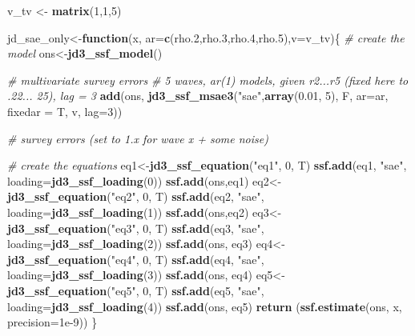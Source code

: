 \documentclass[]{article}
\newenvironment{Shaded}{\begin{snugshade}}{\end{snugshade}}
\newcommand{\KeywordTok}[1]{\textcolor[rgb]{0.13,0.29,0.53}{\textbf{#1}}}
\newcommand{\DataTypeTok}[1]{\textcolor[rgb]{0.13,0.29,0.53}{#1}}
\newcommand{\DecValTok}[1]{\textcolor[rgb]{0.00,0.00,0.81}{#1}}
\newcommand{\FloatTok}[1]{\textcolor[rgb]{0.00,0.00,0.81}{#1}}
\newcommand{\StringTok}[1]{\textcolor[rgb]{0.31,0.60,0.02}{#1}}
\newcommand{\CommentTok}[1]{\textcolor[rgb]{0.56,0.35,0.01}{\textit{#1}}}
\newcommand{\ControlFlowTok}[1]{\textcolor[rgb]{0.13,0.29,0.53}{\textbf{#1}}}
\newcommand{\NormalTok}[1]{#1}
\begin{document}
\begin{Shaded}
\begin{Highlighting}[]
\NormalTok{v_tv <-}\StringTok{ }\KeywordTok{matrix}\NormalTok{(}\DecValTok{1}\NormalTok{,}\DecValTok{1}\NormalTok{,}\DecValTok{5}\NormalTok{)}

\NormalTok{jd_sae_only<-}\ControlFlowTok{function}\NormalTok{(x, }\DataTypeTok{ar=}\KeywordTok{c}\NormalTok{(rho.}\DecValTok{2}\NormalTok{,rho.}\DecValTok{3}\NormalTok{,rho.}\DecValTok{4}\NormalTok{,rho.}\DecValTok{5}\NormalTok{),}\DataTypeTok{v=}\NormalTok{v_tv)\{}
  \CommentTok{# create the model}
\NormalTok{  ons<-}\KeywordTok{jd3_ssf_model}\NormalTok{()}
  
  \CommentTok{# multivariate survey errors }
  \CommentTok{# 5 waves, ar(1) models, given r2...r5 (fixed here to .22... 25), lag = 3}
  \KeywordTok{add}\NormalTok{(ons, }\KeywordTok{jd3_ssf_msae3}\NormalTok{(}\StringTok{"sae"}\NormalTok{,}\KeywordTok{array}\NormalTok{(}\FloatTok{0.01}\NormalTok{, }\DecValTok{5}\NormalTok{), F, }\DataTypeTok{ar=}\NormalTok{ar, }\DataTypeTok{fixedar =}\NormalTok{ T, v, }\DataTypeTok{lag=}\DecValTok{3}\NormalTok{))}
  
  \CommentTok{# survey errors (set to 1.x for wave x + some noise)}
  
  \CommentTok{# create the equations }
\NormalTok{  eq1<-}\KeywordTok{jd3_ssf_equation}\NormalTok{(}\StringTok{"eq1"}\NormalTok{, }\DecValTok{0}\NormalTok{, T)}
  \KeywordTok{ssf.add}\NormalTok{(eq1, }\StringTok{"sae"}\NormalTok{, }\DataTypeTok{loading=}\KeywordTok{jd3_ssf_loading}\NormalTok{(}\DecValTok{0}\NormalTok{))}
  \KeywordTok{ssf.add}\NormalTok{(ons,eq1)}
\NormalTok{  eq2<-}\KeywordTok{jd3_ssf_equation}\NormalTok{(}\StringTok{"eq2"}\NormalTok{, }\DecValTok{0}\NormalTok{, T)}
  \KeywordTok{ssf.add}\NormalTok{(eq2, }\StringTok{"sae"}\NormalTok{, }\DataTypeTok{loading=}\KeywordTok{jd3_ssf_loading}\NormalTok{(}\DecValTok{1}\NormalTok{))}
  \KeywordTok{ssf.add}\NormalTok{(ons,eq2)}
\NormalTok{  eq3<-}\KeywordTok{jd3_ssf_equation}\NormalTok{(}\StringTok{"eq3"}\NormalTok{, }\DecValTok{0}\NormalTok{, T)}
  \KeywordTok{ssf.add}\NormalTok{(eq3, }\StringTok{"sae"}\NormalTok{, }\DataTypeTok{loading=}\KeywordTok{jd3_ssf_loading}\NormalTok{(}\DecValTok{2}\NormalTok{))}
  \KeywordTok{ssf.add}\NormalTok{(ons, eq3)}
\NormalTok{  eq4<-}\KeywordTok{jd3_ssf_equation}\NormalTok{(}\StringTok{"eq4"}\NormalTok{, }\DecValTok{0}\NormalTok{, T)}
  \KeywordTok{ssf.add}\NormalTok{(eq4, }\StringTok{"sae"}\NormalTok{, }\DataTypeTok{loading=}\KeywordTok{jd3_ssf_loading}\NormalTok{(}\DecValTok{3}\NormalTok{))}
  \KeywordTok{ssf.add}\NormalTok{(ons, eq4)}
\NormalTok{  eq5<-}\KeywordTok{jd3_ssf_equation}\NormalTok{(}\StringTok{"eq5"}\NormalTok{, }\DecValTok{0}\NormalTok{, T)}
  \KeywordTok{ssf.add}\NormalTok{(eq5, }\StringTok{"sae"}\NormalTok{, }\DataTypeTok{loading=}\KeywordTok{jd3_ssf_loading}\NormalTok{(}\DecValTok{4}\NormalTok{))}
  \KeywordTok{ssf.add}\NormalTok{(ons, eq5)}
  \KeywordTok{return}\NormalTok{ (}\KeywordTok{ssf.estimate}\NormalTok{(ons, x, }\DataTypeTok{precision=}\FloatTok{1e-9}\NormalTok{))}
\NormalTok{\}}


\end{Highlighting}
\end{Shaded}
\end{document}
